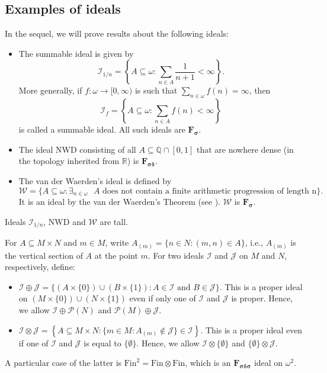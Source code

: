 \documentclass{amsart}
\theoremstyle{plain}
\theoremstyle{definition}
\theoremstyle{remark}
\newcommand{\bQ}{\mathbb{Q}}
\newcommand{\Q}{\bQ}
\newcommand{\cI}{\mathcal{I}}
\newcommand{\I}{\cI}
\newcommand{\cJ}{\mathcal{J}}
\newcommand{\J}{\cJ}
\newcommand{\cW}{\mathcal{W}}
\newcommand{\Fin}{\mathrm{Fin}}
\newcommand{\nwd}{\mathrm{NWD}}
\begin{document}
\subsection{Examples of ideals}

In the sequel, we will prove results about the following ideals:
\begin{itemize}
    \item The summable ideal is given by 
    $$\I_{1/n} = \left\{A\subseteq\omega: \sum_{n\in A}\frac{1}{n+1}<\infty\right\}.$$
    More generally, if $f:\omega\to[0,\infty)$ is such that $\sum_{n\in\omega}f(n)=\infty$, then 
    $$\I_{f} = \left\{A\subseteq\omega: \sum_{n\in A}f(n)<\infty\right\}$$
    is called a summable ideal. All such ideals are $\mathbf{F_{\sigma}}$. 
    \item The ideal $\nwd$ consisting of all $A\subseteq \Q\cap [0,1]$ that are nowhere dense (in the topology inherited from $\mathbb{R}$) is $\mathbf{F_{\sigma\delta}}$.
    \item The van der Waerden's ideal is defined by 
    $$\mathcal{W}= \{A \subseteq \omega : \exists_{n \in \omega} \textrm{ } A \textrm{  does not contain a finite arithmetic progression of length n} \}.$$
    It is an ideal by the van der Waerden's Theorem (see \cite{vanderWearden}). $\cW$ is $\mathbf{F_{\sigma}}$.
\end{itemize}
Ideals $\I_{1/n}$, $\nwd$ and $\cW$ are tall.

For $A\subseteq M\times N$ and $m\in M$, write $A_{(m)}=\{n\in N: (m,n)\in A\}$, i.e., $A_{(m)}$ is 
the vertical section of $A$ at the point $m$. For two ideals $\I$ and $\J$ on $M$ and $N$, respectively, define: 
\begin{itemize}
    \item $\I \oplus \J=\{(A \times \{0\}) \cup (B \times \{1\}): A \in \I\text{ and } B \in \J \}$. This is a proper ideal on $(M\times\{0\})\cup(N\times\{1\})$ even if only one of $\I$ and $\J$ is proper. Hence, we allow $\I\oplus\mathcal{P}(N)$ and $\mathcal{P}(M)\oplus\J$.
    \item $\I\otimes\J=\left\{A\subseteq M\times N: \{m\in M:A_{(m)}\notin\J\}\in\I\right\}$. This is a proper ideal even if one of $\I$ and $\J$ is equal to $\{\emptyset\}$. Hence, we allow $\I\otimes\{\emptyset\}$ and $\{\emptyset\}\otimes\J$.
\end{itemize}
A particular case of the latter is $\Fin^2 = \Fin\otimes\Fin$, which is an $\mathbf{F_{\sigma\delta\sigma}}$ ideal on $\omega^2$.
\end{document}

